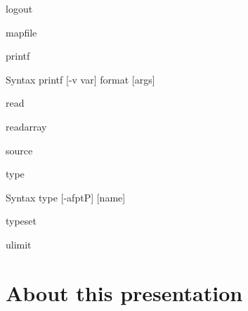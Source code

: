 \documentclass[10pt, compress, aspectratio=169]{beamer}
\begin{document}
\begin{frame}{logout}
\end{frame}

\begin{frame}{mapfile}
\end{frame}

\begin{frame}{printf}
  \begin{alertblock}{Syntax}
    printf [-v var] format [args]
  \end{alertblock}
\end{frame}

\begin{frame}{read}

\end{frame}

\begin{frame}{readarray}
\end{frame}

\begin{frame}{source}
\end{frame}

\begin{frame}{type}
  \begin{alertblock}{Syntax}
    type [-afptP] [name]
  \end{alertblock}
\end{frame}

\begin{frame}{typeset}
\end{frame}

\begin{frame}{ulimit}
\end{frame}

\section{About this presentation}
\begin{frame}[standout]
   \begin{center}\ccbysa\end{center}
\end{frame}

\maketitle
\end{document}
